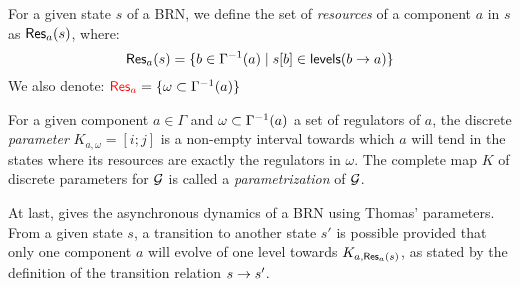 \begin{definition}\label{def:resources}
For a given state $s$ of a BRN, we define the set of \emph{resources} of a component $a$ in $s$ as $\mathsf{Res}_{a}(s)$, where:
$$\mathsf{Res}_{a}(s) = \{ b \in \Gamma^{-1}(a) \mid {s[b]} \in \mathsf{levels}(b\rightarrow a) \}$$
We also denote: $\textcolor{red}{\mathsf{Res}_{a}} = \{ \omega \subset \Gamma^{-1}(a) \}$
\end{definition}

\begin{definition}\label{def:param}
For a given component $a \in \Gamma$ and $\omega \subset \Gamma^{-1}(a)$ a set of regulators of $a$,
the discrete \emph{parameter} $K_{a,\omega} = [i; j]$ is a non-empty interval towards which $a$ will tend
in the states where its resources are exactly the regulators in $\omega$.
The complete map $K$ of discrete parameters for $\mathcal{G}$ is called a \emph{parametrization} of $\mathcal{G}$.
\end{definition}


At last,  gives the asynchronous dynamics of a BRN using Thomas' parameters.
From a given state $s$, a transition to another state $s'$ is possible provided that only one component $a$ will evolve of one level towards $K_{a,\mathsf{Res}_{a}(s)}$,
as stated by the definition of the transition relation $s \rightarrow s'$.

